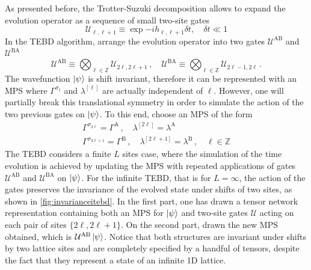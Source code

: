         As presented before, the Trotter-Suzuki decomposition allows to expand the evolution operator as a sequence of small two-site gates
        \begin{equation}
            \mathcal{U}_{\ell,\ell+1}\equiv\exp{-i h_{\ell,\ell+1}\delta t},\quad\delta t \ll 1
        \end{equation}
        In the TEBD algorithm, arrange the evolution operator into two gates $\mathcal{U}^\text{AB}$ and $\mathcal{U}^\text{BA}$
        \begin{equation}
            \mathcal{U}^\text{AB}\equiv\bigotimes_{\ell\in\mathbb{Z}}\mathcal{U}_{2\ell,2\ell+1}\,,\quad\mathcal{U}^\text{BA}\equiv\bigotimes_{\ell\in\mathbb{Z}}\mathcal{U}_{2\ell-1,2\ell}\,.
        \end{equation}
        The wavefunction $\ket{\psi}$ is shift invariant, therefore it can be represented with an MPS where $\Gamma^{\sigma_\ell}$ and $\lambda^{[\ell]}$ are actually independent of $\ell$. However, one will partially break this translational symmetry in order to simulate the action of the two previous gates on $\ket{\psi}$. To this end, choose an MPS of the form
        \begin{gather}
            \Gamma^{\sigma_{2\ell}}=\Gamma^\text{A}\,,\quad\lambda^{[2\ell]}=\lambda^\text{A}\\
            \Gamma^{\sigma_{2\ell+1}}=\Gamma^\text{B}\,,\quad\lambda^{[2\ell+1]}=\lambda^\text{B}\,,\quad\ell\in\mathbb{Z}
        \end{gather}
        The TEBD considers a finite $L$ sites case, where the simulation of the time evolution is achieved by updating the MPS with repeated applications of gates $\mathcal{U}^\text{AB}$ and $\mathcal{U}^\text{BA}$ on $\ket{\psi}$. For the infinite TEBD, that is for $L=\infty$, the action of the gates preserves the invariance of the evolved state under shifts of two sites, as shown in \autoref{fig:invarianceitebd}. In the first part, one has drawn a tensor network representation containing both an MPS for $\ket{\psi}$ and two-site gates $\mathcal{U}$ acting on each pair of sites $\{2\ell, 2\ell+1\}$. On the second part, drawn the new MPS obtained, which is $\mathcal{U}^\text{AB}\ket{\psi}$. Notice that both structures are invariant under shifts by two lattice sites and are completely specified by a handful of tensors, despite the fact that they represent a state of an infinite 1D lattice.

